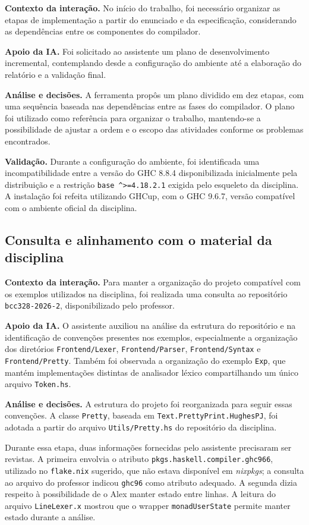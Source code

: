 \textbf{Contexto da interação.} No início do trabalho, foi necessário
organizar as etapas de implementação a partir do enunciado e da
especificação, considerando as dependências entre os componentes
do compilador.

\textbf{Apoio da IA.} Foi solicitado ao assistente um plano de
desenvolvimento incremental, contemplando desde a configuração do
ambiente até a elaboração do relatório e a validação final.

\textbf{Análise e decisões.} A ferramenta propôs um plano dividido
em dez etapas, com uma sequência baseada nas dependências entre
as fases do compilador. O plano foi utilizado como referência para
organizar o trabalho, mantendo-se a possibilidade de ajustar a ordem
e o escopo das atividades conforme os problemas encontrados.

\textbf{Validação.} Durante a configuração do ambiente, foi
identificada uma incompatibilidade entre a versão do GHC 8.8.4
disponibilizada inicialmente pela distribuição e a restrição
\texttt{base \^{}>=4.18.2.1} exigida pelo esqueleto da disciplina.
A instalação foi refeita utilizando GHCup, com o GHC 9.6.7,
versão compatível com o ambiente oficial da disciplina.

\subsection{Consulta e alinhamento com o material da disciplina}

\textbf{Contexto da interação.} Para manter a organização do projeto
compatível com os exemplos utilizados na disciplina, foi realizada
uma consulta ao repositório \texttt{bcc328-2026-2}, disponibilizado
pelo professor.

\textbf{Apoio da IA.} O assistente auxiliou na análise da estrutura
do repositório e na identificação de convenções presentes nos
exemplos, especialmente a organização dos diretórios
\texttt{Frontend/Lexer}, \texttt{Frontend/Parser},
\texttt{Frontend/Syntax} e \texttt{Frontend/Pretty}. Também foi
observada a organização do exemplo \texttt{Exp}, que mantém
implementações distintas de analisador léxico compartilhando
um único arquivo \texttt{Token.hs}.

\textbf{Análise e decisões.} A estrutura do projeto foi reorganizada
para seguir essas convenções. A classe \texttt{Pretty}, baseada em
\texttt{Text.PrettyPrint.HughesPJ}, foi adotada a partir do arquivo
\texttt{Utils/Pretty.hs} do repositório da disciplina.

Durante essa etapa, duas informações fornecidas pelo assistente
precisaram ser revistas. A primeira envolvia o atributo
\texttt{pkgs.haskell.compiler.ghc966}, utilizado no
\texttt{flake.nix} sugerido, que não estava disponível em
\emph{nixpkgs}; a consulta ao arquivo do professor indicou
\texttt{ghc96} como atributo adequado. A segunda dizia respeito
à possibilidade de o Alex manter estado entre linhas. A leitura
do arquivo \texttt{LineLexer.x} mostrou que o wrapper
\texttt{monadUserState} permite manter estado durante a análise.

